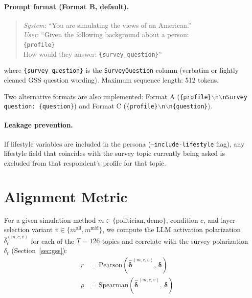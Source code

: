 \documentclass[12pt]{article}
\begin{document}
\paragraph{Prompt format (Format B, default).}
\begin{quote}
\textit{System}: ``You are simulating the views of an American.''\\[2pt]
\textit{User}: ``Given the following background about a person:\\
\quad\texttt{\{profile\}}\\[2pt]
How would they answer: \texttt{\{survey\_question\}}''
\end{quote}
where \texttt{\{survey\_question\}} is the \texttt{SurveyQuestion} column (verbatim or lightly cleaned GSS question wording). Maximum sequence length: 512 tokens.

Two alternative formats are also implemented: Format A (\texttt{\{profile\}$\backslash$n$\backslash$nSurvey question: \{question\}}) and Format C (\texttt{\{profile\}$\backslash$n$\backslash$n\{question\}}).

\paragraph{Leakage prevention.}
If lifestyle variables are included in the persona (\texttt{--include-lifestyle} flag), any lifestyle field that coincides with the survey topic currently being asked is excluded from that respondent's profile for that topic.

\section{Alignment Metric}
\label{sec:alignment}

For a given simulation method $m \in \{\text{politician}, \text{demo}\}$, condition $c$, and layer-selection variant $v \in \{m^\text{all}, m^\text{mid}\}$, we compute the LLM activation polarization $\hat{\delta}_t^{(m,c,v)}$ for each of the $T = 126$ topics and correlate with the survey polarization $\delta_t$ (Section~\ref{sec:gss}):
\begin{align}
    r &= \mathrm{Pearson}\!\left(\hat{\boldsymbol{\delta}}^{(m,c,v)},\, \boldsymbol{\delta}\right) \\
    \rho &= \mathrm{Spearman}\!\left(\hat{\boldsymbol{\delta}}^{(m,c,v)},\, \boldsymbol{\delta}\right)
\end{align}
\end{document}

